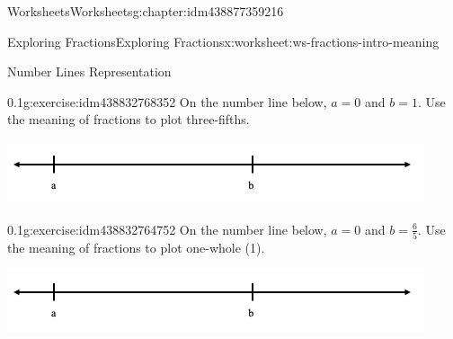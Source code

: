 \documentclass[twoside,11pt,]{book}
\begin{document}
\begin{chapterptx}{Worksheets}{}{Worksheets}{}{}{g:chapter:idm438877359216}
\begin{worksheet-section-numberless}{Exploring Fractions}{}{Exploring Fractions}{}{}{x:worksheet:ws-fractions-intro-meaning}
\begin{introduction}{}
Number Lines Representation%
\end{introduction}%
\begin{divisionexercise}{9}{}{0.1}{g:exercise:idm438832768352}%
On the number line below, \(a= 0 \) and \(b=1 \).  Use the meaning of fractions to plot three-fifths.%
\begin{sidebyside}{1}{0}{0}{0}%
\begin{sbspanel}{1}%
\includegraphics[width=1\linewidth]{images/fractions-number-line.png}
\end{sbspanel}%
\end{sidebyside}%
\end{divisionexercise}%
\begin{divisionexercise}{10}{}{0.1}{g:exercise:idm438832764752}%
On the number line below, \(a= 0 \) and \(b=\frac{6}{5} \).  Use the meaning of fractions to plot one-whole (1).%
\begin{sidebyside}{1}{0}{0}{0}%
\begin{sbspanel}{1}%
\includegraphics[width=1\linewidth]{images/fractions-number-line.png}
\end{sbspanel}%
\end{sidebyside}%
\end{divisionexercise}%
\end{worksheet-section-numberless}
\restoregeometry
\end{chapterptx}
\end{document}
